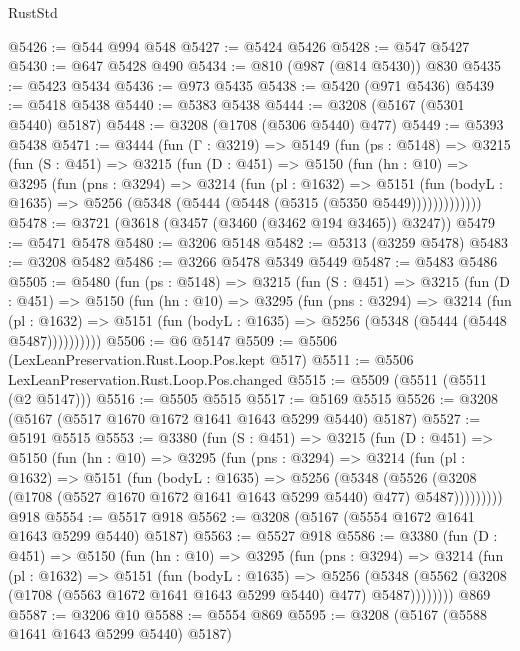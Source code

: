 \begin{lexlean}{RustStd}
\begin{coremodule}
@5426 := @544 @994 @548
@5427 := @5424 @5426
@5428 := @547 @5427
@5430 := @647 @5428 @490
@5434 := @810 (@987 (@814 @5430)) @830
@5435 := @5423 @5434
@5436 := @973 @5435
@5438 := @5420 (@971 @5436)
@5439 := @5418 @5438
@5440 := @5383 @5438
@5444 := @3208 (@5167 (@5301 @5440) @5187)
@5448 := @3208 (@1708 (@5306 @5440) @477)
@5449 := @5393 @5438
@5471 := @3444
    (fun (Γ : @3219) =>
    @5149
      (fun (ps : @5148) =>
      @3215
        (fun (S : @451) =>
        @3215
          (fun (D : @451) =>
          @5150
            (fun (hn : @10) =>
            @3295
              (fun (pns : @3294) =>
              @3214
                (fun (pl : @1632) =>
                @5151
                  (fun (bodyL : @1635) =>
                  @5256 (@5348 (@5444 (@5448 (@5315 (@5350 @5449)))))))))))))
@5478 := @3721 (@3618 (@3457 (@3460 (@3462 @194 @3465)) @3247))
@5479 := @5471 @5478
@5480 := @3206 @5148
@5482 := @5313 (@3259 @5478)
@5483 := @3208 @5482
@5486 := @3266 @5478 @5349 @5449
@5487 := @5483 @5486
@5505 := @5480
    (fun (ps : @5148) =>
    @3215
      (fun (S : @451) =>
      @3215
        (fun (D : @451) =>
        @5150
          (fun (hn : @10) =>
          @3295
            (fun (pns : @3294) =>
            @3214
              (fun (pl : @1632) =>
              @5151 (fun (bodyL : @1635) => @5256 (@5348 (@5444 (@5448 @5487))))))))))
@5506 := @6 @5147
@5509 := @5506 (LexLeanPreservation.Rust.Loop.Pos.kept @517)
@5511 := @5506 LexLeanPreservation.Rust.Loop.Pos.changed
@5515 := @5509 (@5511 (@5511 (@2 @5147)))
@5516 := @5505 @5515
@5517 := @5169 @5515
@5526 := @3208 (@5167 (@5517 @1670 @1672 @1641 @1643 @5299 @5440) @5187)
@5527 := @5191 @5515
@5553 := @3380
    (fun (S : @451) =>
    @3215
      (fun (D : @451) =>
      @5150
        (fun (hn : @10) =>
        @3295
          (fun (pns : @3294) =>
          @3214
            (fun (pl : @1632) =>
            @5151
              (fun (bodyL : @1635) =>
              @5256
                (@5348
                  (@5526
                    (@3208 (@1708 (@5527 @1670 @1672 @1641 @1643 @5299 @5440) @477) @5487)))))))))
    @918
@5554 := @5517 @918
@5562 := @3208 (@5167 (@5554 @1672 @1641 @1643 @5299 @5440) @5187)
@5563 := @5527 @918
@5586 := @3380
    (fun (D : @451) =>
    @5150
      (fun (hn : @10) =>
      @3295
        (fun (pns : @3294) =>
        @3214
          (fun (pl : @1632) =>
          @5151
            (fun (bodyL : @1635) =>
            @5256
              (@5348 (@5562 (@3208 (@1708 (@5563 @1672 @1641 @1643 @5299 @5440) @477) @5487))))))))
    @869
@5587 := @3206 @10
@5588 := @5554 @869
@5595 := @3208 (@5167 (@5588 @1641 @1643 @5299 @5440) @5187)

\end{coremodule}
\end{lexlean}
